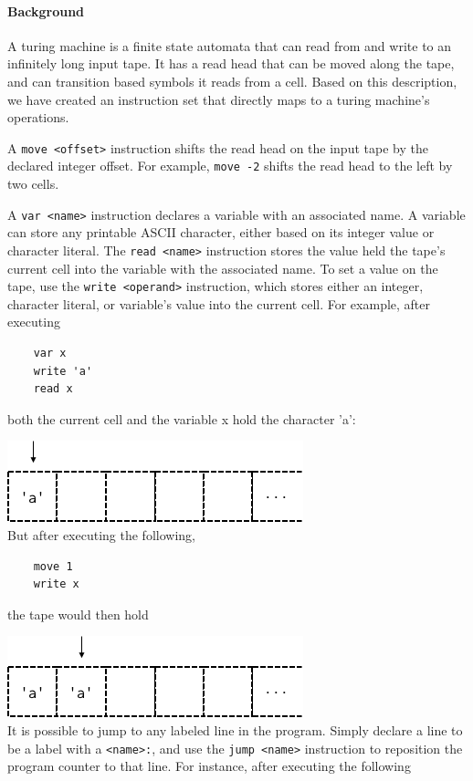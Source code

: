 \documentclass[10pt]{article}
\begin{document}
\paragraph{Background} A turing machine is a finite state automata that can read from and write to an infinitely long input tape. It has a read head that can be moved along the tape, and can transition based symbols it reads from a cell. Based on this description, we have created an instruction set that directly maps to a turing machine's operations.\par
A \texttt{move <offset>} instruction shifts the read head on the input tape by the declared integer offset. For example, \texttt{move -2} shifts the read head to the left by two cells.\par
A \texttt{var <name>} instruction declares a variable with an associated name. A variable can store any printable ASCII character, either based on its integer value or character literal. The \texttt{read <name>} instruction stores the value held the tape's current cell into the variable with the associated name. To set a value on the tape, use the \texttt{write <operand>} instruction, which stores either an integer, character literal, or variable's value into the current cell. For example, after executing
\begin{verbatim}
    var x
    write 'a'
    read x
\end{verbatim}
both the current cell and the variable x hold the character 'a':\par
\includegraphics[scale=.5]{tm1}\\
But after executing the following,\par
\begin{verbatim}
    move 1
    write x
\end{verbatim}
the tape would then hold\par
\includegraphics[scale=.5]{tm2}\\
It is possible to jump to any labeled line in the program. Simply declare a line to be a label with a \texttt{<name>:}, and use the \texttt{jump <name>} instruction to reposition the program counter to that line. For instance, after executing the following\par
\end{document}
